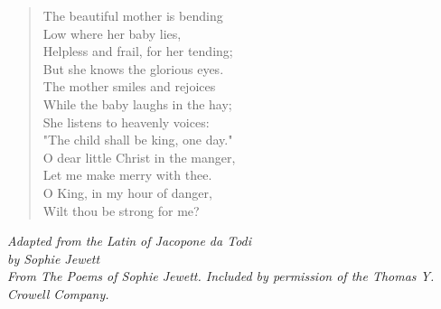 
\begin{verse}
The beautiful mother is bending\\
\hspace*{2em}Low where her baby lies,\\
Helpless and frail, for her tending;\\
\hspace*{2em}But she knows the glorious eyes.\\[0.7em]

The mother smiles and rejoices\\
\hspace*{2em}While the baby laughs in the hay;\\
She listens to heavenly voices:\\
\hspace*{2em}"The child shall be king, one day."\\[0.7em]

O dear little Christ in the manger,\\
\hspace*{2em}Let me make merry with thee.\\
O King, in my hour of danger,\\
\hspace*{2em}Wilt thou be strong for me?%
\end{verse}

\vspace{0.5\baselineskip}
\noindent\textit{Adapted from the Latin of Jacopone da Todi}\\
\noindent\textit{by Sophie Jewett}\\[0.5\baselineskip]
\noindent\textit{From \emph{The Poems of Sophie Jewett.} Included by permission of the Thomas Y. Crowell Company.}

\newpage
